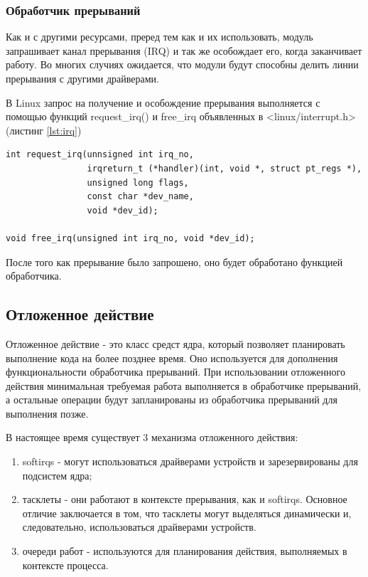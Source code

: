 \subsubsection{Обработчик прерываний}
Как и с другими ресурсами, преред тем как и их использовать, модуль запрашивает канал прерывания (IRQ) и так же особождает его, когда заканчивает работу.
Во многих случиях ожидается, что модули будут способны делить линии прерывания с другими драйверами.

В Linux запрос на получение и особождение прерывания выполняется с помощью функций request\_irq() и free\_irq объявленных в <linux/interrupt.h> (листинг \ref{lst:irq})
\begin{lstlisting}[caption={Функция request\_irq() и free\_irq()}, label={lst:irq}]
int request_irq(unnsigned int irq_no,
				irqreturn_t (*handler)(int, void *, struct pt_regs *),
				unsigned long flags,
				const char *dev_name,
				void *dev_id);

void free_irq(unsigned int irq_no, void *dev_id);
\end{lstlisting}

После того как прерывание было запрошено, оно будет обработано функцией обработчика.

\subsection{Отложенное действие}
Отложенное действие - это класс средст ядра, который позволяет планировать выполнение кода на более позднее время.
Оно используется для дополнения функциональности обработчика прерываний.
При использовании отложенного действия минимальная требуемая работа выполняется в обработчике прерываний, а остальные операции будут запланированы из обработчика прерываний для выполнения позже. 

В настоящее время существует 3 механизма отложенного действия:
\begin{enumerate}
	\item softirqs - могут использоваться драйверами устройств и зарезервированы для подсистем ядра;
	\item тасклеты - они работают в контексте прерывания, как и softirqs.
	Основное отличие заключается в том, что тасклеты могут выделяться динамически и, следовательно, использоваться драйверами устройств.
	\item очереди работ - используются для планирования действия, выполняемых в контексте процесса.
\end{enumerate}

